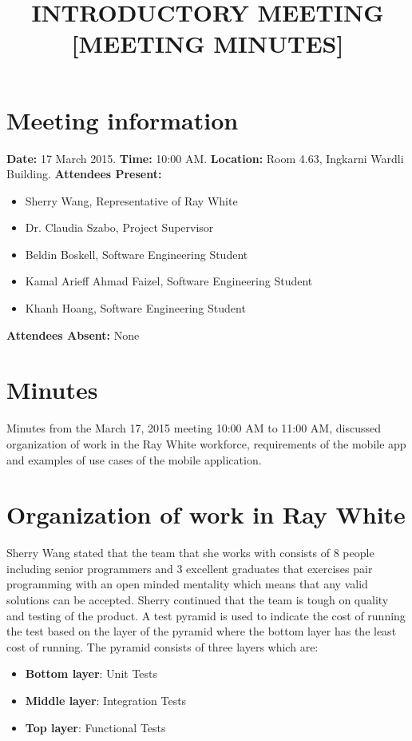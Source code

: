\documentclass[12pt]{article}
\date{}
\title{\textbf{INTRODUCTORY MEETING [MEETING MINUTES]}}
\begin{document}
\maketitle

\section*{Meeting information}
\textbf{Date:} 17 March 2015.\newline
\textbf{Time:} 10:00 AM.\newline
\textbf{Location:} Room 4.63, Ingkarni Wardli Building.\newline
\textbf{Attendees Present:}
\begin{itemize}
\item Sherry Wang, Representative of Ray White
\item Dr. Claudia Szabo, Project Supervisor
\item Beldin Boskell, Software Engineering Student
\item Kamal Arieff Ahmad Faizel, Software Engineering Student
\item Khanh Hoang, Software Engineering Student
\end{itemize}
\textbf{Attendees Absent:} None

\section*{Minutes}
Minutes from the March 17, 2015 meeting 10:00 AM to 11:00 AM, discussed organization of work in the Ray White workforce, requirements of the mobile app and examples of use cases of the mobile application.

\section*{Organization of work in Ray White}
Sherry Wang stated that the team that she works with consists of 8 people including senior programmers and 3 excellent graduates that exercises pair programming with an open minded mentality which means that any valid solutions can be accepted. Sherry continued that the team is tough on quality and testing of the product. A test pyramid is used to indicate the cost of running the test based on the layer of the pyramid where the bottom layer has the least cost of running. The pyramid consists of three layers which are:
\begin{itemize}
\item \textbf{Bottom layer}: Unit Tests
\item \textbf{Middle layer}: Integration Tests
\item \textbf{Top layer}: Functional Tests
\end{itemize}
\end{document}
